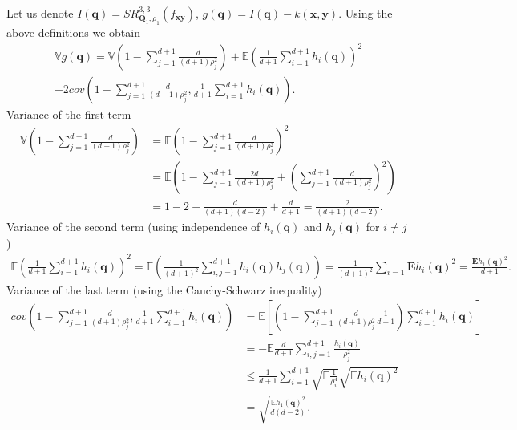 Let us denote $I(\mathbf{q}) = SR^{3, 3}_{\mathbf{Q}_1,\rho_1}(f_{\mathbf{xy}})$,
$g(\mathbf{q}) = I(\mathbf{q}) - k(\mathbf{x}, \mathbf{y})$.
Using the above definitions we obtain
\begin{equation}
\begin{split}
\label{eq:variance_2_full}
\mathbb{V} g(\mathbf{q}) = \mathbb{V}\left ( 1 - \sum_{j = 1}^{d + 1}\frac{d}{(d + 1)\rho_j^2} \right) +
\mathbb{E} \left ( \frac{1}{d + 1} \sum_{i = 1}^{d + 1} h_i(\mathbf{q})\right)^2 \\
+ 2 cov \left ( 1 - \sum_{j = 1}^{d + 1}\frac{d}{(d + 1)\rho_j^2}, \frac{1}{d + 1} \sum_{i = 1}^{d + 1} h_i(\mathbf{q}) \right ).
\end{split}
\end{equation}
Variance of the first term
\begin{align}
\label{eq:variance_2_first_term}
\mathbb{V}\left (1 - \sum_{j = 1}^{d + 1}\frac{d}{(d + 1)\rho_j^2} \right ) &= \mathbb{E}\left (1 - \sum_{j = 1}^{d + 1}\frac{d}{(d + 1)\rho_j^2} \right )^2 \nonumber\\&=
\mathbb{E} \left ( 1 - \sum_{j = 1}^{d + 1}\frac{2d}{(d + 1)\rho_j^2} + \left ( \sum_{j = 1}^{d + 1}\frac{d}{(d + 1)\rho_j^2} \right )^2\right) \nonumber \\
&=1 - 2 + \frac{d}{(d + 1)(d - 2)} + \frac{d}{d + 1} = \frac{2}{(d + 1)(d - 2)}.
\end{align}
Variance of the second term (using independence of $h_i(\mathbf{q})$ and $h_j(\mathbf{q})$ for $i \ne j$)
\begin{align}
\label{eq:variance_2_second_term}
\mathbb{E}\left ( \frac{1}{d + 1} \sum_{i = 1}^{d + 1} h_i(\mathbf{q})\right)^2 =
\mathbb{E}\left ( \frac{1}{(d + 1)^2} \sum_{i, j = 1}^{d + 1} h_i(\mathbf{q}) h_j(\mathbf{q})\right) =
\frac{1}{(d + 1)^2} \sum_{i = 1} \mathbf{E} h_i(\mathbf{q})^2 = \frac{\mathbf{E}h_1(\mathbf{q})^2 }{d + 1}.
\end{align}
Variance of the last term (using the Cauchy-Schwarz inequality)
\begin{align}
\label{eq:variance_2_third_term}
cov \left ( 1 - \sum_{j = 1}^{d + 1}\frac{d}{(d + 1)\rho_j^2}, \frac{1}{d + 1} \sum_{i = 1}^{d + 1} h_i(\mathbf{q})\right) & =
\mathbb{E}\left [ \left (1 - \sum_{j = 1}^{d + 1}\frac{d}{(d + 1)\rho_j^2} \frac{1}{d + 1} \right ) \sum_{i = 1}^{d + 1} h_i(\mathbf{q})\right] \nonumber \\
&= - \mathbb{E}\frac{d}{d + 1} \sum_{i, j = 1}^{d + 1} \frac{h_i (\mathbf{q})}{\rho_j^2} \nonumber \\ &\le
\frac{1}{d + 1} \sum_{i = 1}^{d + 1} \sqrt{\mathbb{E}\frac{1}{\rho_i^4}} \sqrt{\mathbb{E} h_i(\mathbf{q})^2} \nonumber \\ &=
\sqrt{ \frac{\mathbb{E}h_1(\mathbf{q})^2}{d(d - 2)}}.
\end{align}
